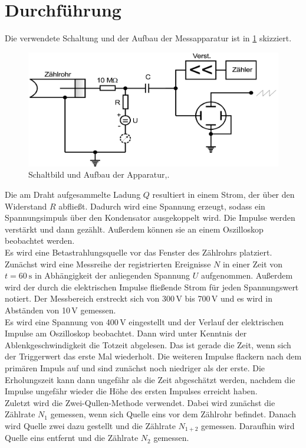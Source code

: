 \section{Durchführung}
\label{sec:Durchführung}
Die verwendete Schaltung und der Aufbau der Messapparatur ist in \ref{fig:schaltung} skizziert.

\begin{figure}
  \centering
  \includegraphics[width=\textwidth]{data/schaltung.png}
  \caption{Schaltbild und Aufbau der Apparatur,\cite{Versuchsanleitung}.}
  \label{fig:schaltung}
\end{figure}

Die am Draht aufgesammelte Ladung $Q$ resultiert in einem Strom, der über den Widerstand $R$
abfließt. Dadurch wird eine Spannung erzeugt, sodass ein Spannungsimpuls über den Kondensator
ausgekoppelt wird. Die Impulse werden verstärkt und dann gezählt. Außerdem können sie an einem Oszilloskop
beobachtet werden.\\
Es wird eine Betastrahlungsquelle vor das Fenster des Zählrohrs platziert.
Zunächst wird eine Messreihe der registrierten Ereignisse $N$ in einer Zeit von $t=\SI{60}{\second}$
in Abhängigkeit der anliegenden Spannung $U$ aufgenommen. Außerdem wird der durch die elektrischen
Impulse fließende Strom für jeden Spannungswert notiert. Der Messbereich erstreckt sich
von 300\,V bis 700\,V und es wird in Abständen von 10\,V gemessen.\\
Es wird eine Spannung von 400\,V eingestellt und der Verlauf der elektrischen Impulse
am Oszilloskop beobachtet. Dann wird unter Kenntnis der Ablenkgeschwindigkeit die Totzeit
abgelesen. Das ist gerade die Zeit, wenn sich der Triggerwert das erste Mal wiederholt.
Die weiteren Impulse flackern nach dem primären Impuls auf und sind zunächst noch niedriger
als der erste. Die Erholungszeit kann dann ungefähr als die Zeit abgeschätzt werden,
nachdem die Impulse ungefähr wieder die Höhe des ersten Impulses erreicht haben.\\
Zuletzt wird die Zwei-Qullen-Methode verwendet. Dabei wird zunächst die Zählrate $N_1$ gemessen,
wenn sich Quelle eins vor dem Zählrohr befindet. Danach wird Quelle zwei dazu gestellt und
die Zählrate $N_{1+2}$ gemessen. Daraufhin wird Quelle eins entfernt und die Zählrate $N_2$ gemessen.
